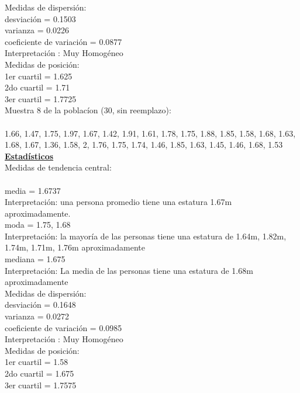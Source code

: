\documentclass[a4paper,12pt]{article}
\begin{document}
\begin{enumerate}
Medidas de dispersi\'on:\\
desviaci\'on = 0.1503\\
varianza = 0.0226\\
coeficiente de variaci\'on = 0.0877\\
Interpretaci\'on : Muy Homog\'eneo\\

Medidas de posici\'on:\\
1er cuartil = 1.625\\
2do cuartil = 1.71\\
3er cuartil = 1.7725\\

Muestra 8 de la poblac\'ion (30, sin reemplazo): \\\\
1.66,	1.47,	1.75,	1.97,	1.67,	1.42,
1.91,	1.61,	1.78,	1.75,	1.88,	1.85,
1.58,	1.68,	1.63,	1.68,	1.67,	1.36,
1.58,	2,      1.76,	1.75,	1.74,	1.46,
1.85,	1.63,	1.45,	1.46,	1.68,	1.53\\

\textbf{\underline{Estad\'isticos}}\\

Medidas de tendencia central:\\\\
media = 1.6737\\
Interpretaci\'on: una persona promedio tiene una estatura 1.67m aproximadamente.\\
moda = 1.75, 1.68\\
Interpretaci\'on: la mayor\'ia de las personas tiene una estatura de 1.64m, 1.82m, 1.74m, 1.71m, 1.76m aproximadamente\\
mediana = 1.675\\
Interpretaci\'on: La media de las personas tiene una estatura de 1.68m aproximadamente\\

Medidas de dispersi\'on:\\
desviaci\'on = 0.1648\\
varianza = 0.0272\\
coeficiente de variaci\'on = 0.0985\\
Interpretaci\'on : Muy Homog\'eneo\\

Medidas de posici\'on:\\
1er cuartil = 1.58\\
2do cuartil = 1.675\\
3er cuartil = 1.7575\\


\end{enumerate}
\end{document}
